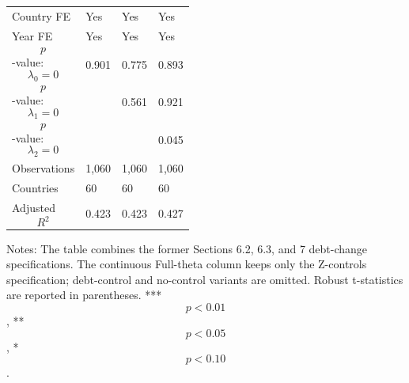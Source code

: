 \begin{table}[H]
\begin{threeparttable}
\begin{tabularx}{\textwidth}{lYYY}
Country FE & Yes & Yes & Yes \\
Year FE & Yes & Yes & Yes \\
$$p$$-value: $$\lambda_0=0$$ & 0.901 & 0.775 & 0.893 \\
$$p$$-value: $$\lambda_1=0$$ &  & 0.561 & 0.921 \\
$$p$$-value: $$\lambda_2=0$$ &  &  & 0.045 \\
Observations & 1,060 & 1,060 & 1,060 \\
Countries & 60 & 60 & 60 \\
Adjusted $$R^2$$ & 0.423 & 0.423 & 0.427 \\
\bottomrule
\end{tabularx}
\begin{tablenotes}[flushleft]\footnotesize
\item Notes: The table combines the former Sections 6.2, 6.3, and 7 debt-change specifications. The continuous Full-theta column keeps only the Z-controls specification; debt-control and no-control variants are omitted. Robust t-statistics are reported in parentheses. *** $$p<0.01$$, ** $$p<0.05$$, * $$p<0.10$$.
\end{tablenotes}
\end{threeparttable}
\end{table}
